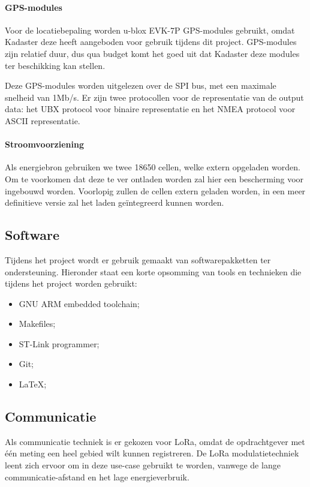\paragraph{GPS-modules}
Voor de locatiebepaling worden u-blox EVK-7P GPS-modules gebruikt, omdat Kadaster deze heeft aangeboden voor gebruik tijdens dit project. GPS-modules zijn relatief duur, dus qua budget komt het goed uit dat Kadaster deze modules ter beschikking kan stellen.

Deze GPS-modules worden uitgelezen over de SPI bus, met een maximale snelheid van 1Mb/s. Er zijn twee protocollen voor de representatie van de output data: het UBX protocol voor binaire representatie en het NMEA protocol voor ASCII representatie.

\paragraph{Stroomvoorziening}
Als energiebron gebruiken we twee 18650 cellen, welke extern opgeladen worden.
Om te voorkomen dat deze te ver ontladen worden zal hier een bescherming voor
ingebouwd worden. Voorlopig zullen de cellen extern geladen worden, in een meer
definitieve versie zal het laden geïntegreerd kunnen worden.

\subsection{Software}
Tijdens het project wordt er gebruik gemaakt van softwarepakketten ter ondersteuning. Hieronder staat een korte opsomming van tools en technieken die tijdens het project worden gebruikt:
\begin{itemize}
    \item GNU ARM embedded toolchain;
    \item Makefiles;
    \item ST-Link programmer;
    \item Git;
    \item \LaTeX;
\end{itemize}

\subsection{Communicatie}
Als communicatie techniek is er gekozen voor LoRa, omdat de opdrachtgever met één meting een heel gebied wilt kunnen registreren. De LoRa modulatietechniek leent zich ervoor om in deze use-case gebruikt te worden, vanwege de lange communicatie-afstand en het lage energieverbruik.

